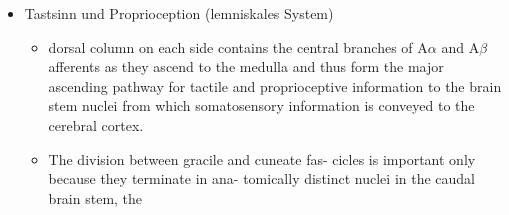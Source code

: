 \documentclass[12pt,a4paper,pdftex]{article}
\begin{document}
\begin{itemize}
    \item Tastsinn und Proprioception (lemniskales System)
    \begin{itemize}

        \item dorsal column on each side contains the central
        branches of A$\alpha$ and A$\beta$ afferents as they ascend to the
        medulla and thus form the major ascending pathway
        for tactile and proprioceptive information to the brain
        stem nuclei from which somatosensory information
        is conveyed to the cerebral cortex.
        \item The division between gracile and cuneate fas-
        cicles is important only because they terminate in ana-
        tomically distinct nuclei in the caudal brain stem, the

\end{itemize}
\end{itemize}
\end{document}
